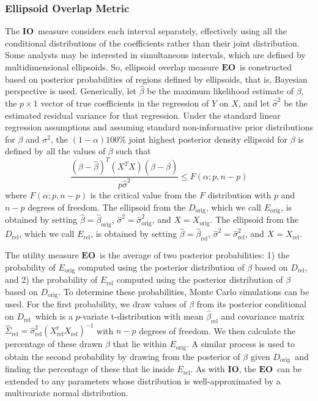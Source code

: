\documentclass[12pt]{article}
\def\DBORIG{\ensuremath{{D}_{\mathrm{orig}}}} %
\def\DBREL{\ensuremath{D_{\mathrm{rel}}}} %
\def\IO{\ensuremath{\mathbf{IO}}} %
\def\EO{\ensuremath{\mathbf{EO}}} %
\begin{document}
\subsubsection{Ellipsoid Overlap Metric}\label{subsec.overlap}
The \IO\ measure considers each interval separately, effectively using all
the conditional distributions of the coefficients rather than
their joint distribution. Some analysts may be interested in
simultaneous intervals, which are defined by multidimensional
ellipsoids.  So, ellipsoid overlap measure \EO\ is constructed 
based on  posterior probabilities of regions defined by ellipsoids, that is, 
Bayesian perspective is used.  Generically, let $\hat{\beta}$ be the
maximum likelihood estimate of $\beta$, the $p \times 1$ vector of
true coefficients in the regression of $Y$ on $X$, and let
$\hat{\sigma}^2$ be the estimated residual variance for that
regression. Under the standard linear regression assumptions and
assuming standard non-informative prior distributions for $\beta$
and $\sigma^2$, the $(1-\alpha)100\%$ joint highest posterior
density ellipsoid for $\beta$ is defined by all the values of
$\beta$ such that
\begin{displaymath}\label{eq_1}
\frac{(\beta
-\hat{\beta})^T(X^{T}X)(\beta-\hat{\beta})}{p\hat{\sigma}^2} \leq
F(\alpha;p, n-p)
\end{displaymath}
where $F(\alpha;p, n-p)$ is the critical value from the $F$
distribution with $p$ and $n-p$ degrees of freedom.  The ellipsoid
from the \DBORIG, which we call $E_{\mathrm{orig}}$, is obtained
by setting $\hat{\beta} = \hat{\beta}_{\mathrm{orig}}$,
$\hat{\sigma}^2 = \hat{\sigma}^2_{\mathrm{orig}}$, and $X =
X_{\mathrm{orig}}$. The ellipsoid from the \DBREL, which we call
$E_{\mathrm{rel}}$, is obtained by setting $\hat{\beta} =
\hat{\beta}_{\mathrm{rel}}$, $\hat{\sigma}^2 =
\hat{\sigma}^2_{\mathrm{rel}}$, and $X = X_{\mathrm{rel}}$.

The utility measure \EO\ is the average of two posterior
probabilities: 1) the probability of $E_{\mathrm{orig}}$ computed
using the posterior distribution of $\beta$ based on \DBREL, and
2) the probability of $E_{\mathrm{rel}}$ computed using the
posterior distribution of $\beta$ based on \DBORIG. To determine
these probabilities,  Monte Carlo simulations can be used. For the first
probability, we draw values of $\beta$ from its posterior
conditional on \DBREL\ which is a $p$-variate t-distribution with
mean $\hat{\beta}_{\mathrm{rel}}$ and covariance matrix
$\hat{\Sigma}_{\mathrm{rel}} =
\hat{\sigma}^2_{\mathrm{rel}}(X_{\mathrm{rel}}^{t}X_{\mathrm{rel}})^{-1}$
with $n-p$ degrees of freedom. We then calculate the percentage of
these drawn $\beta$ that lie within $E_{\mathrm{orig}}$.  A
similar process is used to obtain the second probability by
drawing from the posterior of $\beta$ given \DBORIG\ and finding
the percentage of these that lie inside $E_{\mathrm{rel}}$. As
with \IO, the \EO\ can be extended to any parameters whose
distribution is well-approximated by a multivariate normal
distribution.
\end{document}
